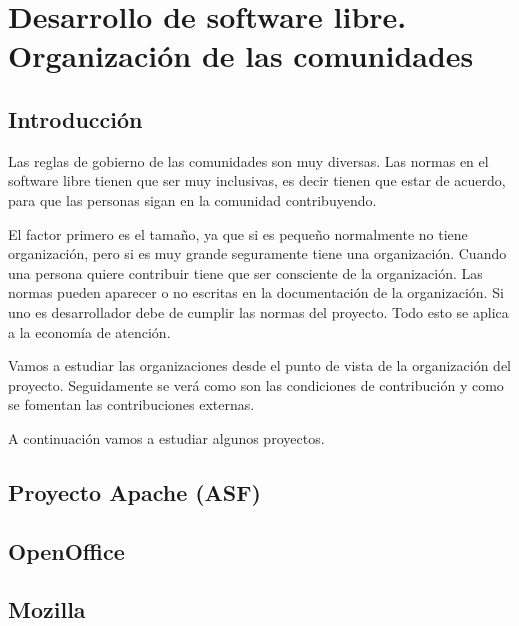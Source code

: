 \chapter{Desarrollo de software libre. Organizaci\'on de las comunidades}
\label{CHAP5:Development}
\section{Introducci\'on}
Las reglas de gobierno de las comunidades son muy diversas. Las normas en el software libre tienen que ser muy inclusivas, es decir tienen que estar de acuerdo, para que las personas sigan en la comunidad contribuyendo.

El factor primero es el tama\~no, ya que si es peque\~no normalmente no tiene organizaci\'on, pero si es muy grande seguramente tiene una organizaci\'on. Cuando una persona quiere contribuir tiene que ser consciente de la organizaci\'on. Las normas pueden aparecer o no escritas en la documentaci\'on de la organizaci\'on. Si uno es desarrollador debe de cumplir las normas del proyecto. Todo esto se aplica a la econom\'ia de atenci\'on.

Vamos a estudiar las organizaciones desde el punto de vista de la organizaci\'on del proyecto. Seguidamente se ver\'a como son las condiciones de contribuci\'on y como se fomentan las contribuciones externas.

A continuaci\'on vamos a estudiar algunos proyectos.

\section{Proyecto Apache (ASF)}
\section{OpenOffice}
\section{Mozilla}